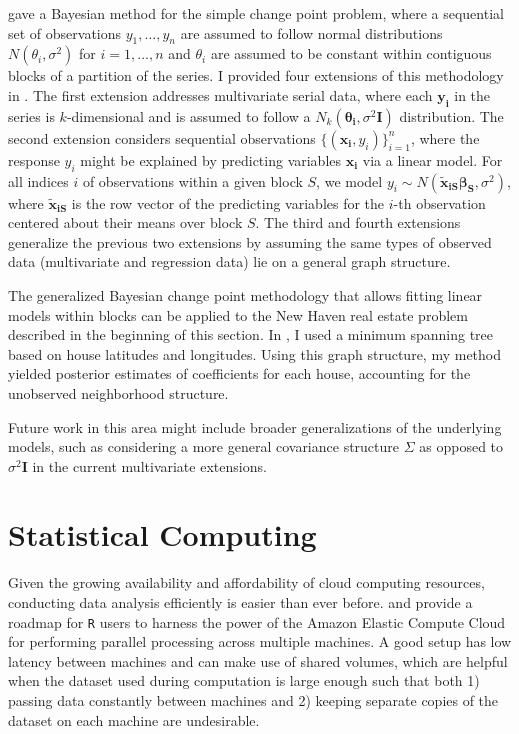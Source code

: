 \documentclass[11pt]{article}
\begin{document}
 \cite{barry93} gave a Bayesian method for the simple change point problem, where a sequential set of observations $y_1,\dots,y_n$ are assumed to follow normal distributions $N(\theta_i,\sigma^2)$ for $i=1,\dots,n$ and $\theta_i$ are assumed to be constant within contiguous blocks of a partition of the series. I provided four extensions of this methodology in \cite{bcp}. The first extension addresses multivariate serial data, where each $\bm{y_i}$ in the series is $k$-dimensional and is assumed to follow a $N_k(\bm{\theta_i},\sigma^2\bm{I})$ distribution. The second extension considers sequential observations $\{(\bm{x_i},y_i)\}_{i=1}^n$, where the response $y_i$ might be explained by predicting variables $\bm{x_i}$ via a linear model. For all indices $i$ of observations within a given block $S$, we model $y_i\sim N(\bm{\widetilde{x}_{iS}}\bm{\beta_S}, \sigma^2)$, where $\bm{\widetilde{x}_{iS}}$ is the row vector of the predicting variables for the $i$-th observation centered about their means over block $S$. The third and fourth extensions generalize the previous two extensions by assuming the same types of observed data (multivariate and regression data) lie on a general graph structure. 

 The generalized Bayesian change point methodology that allows fitting linear models within blocks can be applied to the New Haven real estate problem described in the beginning of this section. In \cite{bcp}, I used a minimum spanning tree based on house latitudes and longitudes. Using this graph structure, my method yielded posterior estimates of coefficients for each house, accounting for the unobserved neighborhood structure.

 Future work in this area might include broader generalizations of the underlying models, such as considering a more general covariance structure $\Sigma$ as opposed to $\sigma^2\bm{I}$ in the current multivariate extensions. 

 \section{Statistical Computing} %
 \label{sec:statistical_computing}
  Given the growing availability and affordability of cloud computing resources, conducting data analysis efficiently is easier than ever before.  \cite{ec2} and \cite{ec2-b} provide a roadmap for \verb|R| users to harness the power of the Amazon Elastic Compute Cloud for performing parallel processing across multiple machines. A good setup has low latency between machines and can make use of shared volumes, which are helpful when the dataset used during computation is large enough such that both 1) passing data constantly between machines and 2) keeping separate copies of the dataset on each machine are undesirable.
\end{document}
